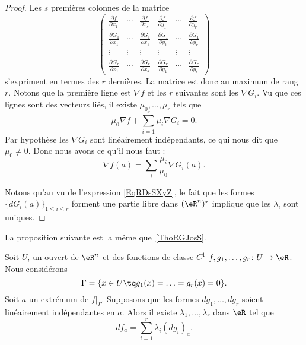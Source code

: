 \begin{proof}
	Les \( s\) premières colonnes de la matrice
	\begin{equation}
		\begin{pmatrix}
			\frac{ \partial f }{ \partial x_1 }   & \cdots & \frac{ \partial f }{ \partial x_s }   & \frac{ \partial f }{ \partial y_1 }   & \cdots & \frac{ \partial f }{ \partial y_r }   \\
			\frac{ \partial G_1 }{ \partial x_1 } & \cdots & \frac{ \partial G_1 }{ \partial x_s } & \frac{ \partial G_1 }{ \partial y_1 } & \cdots & \frac{ \partial G_1 }{ \partial y_r } \\
			\vdots                                & \vdots & \vdots                                & \vdots                                & \vdots & \vdots                                \\
			\frac{ \partial G_r }{ \partial x_1 } & \cdots & \frac{ \partial G_r }{ \partial x_s } & \frac{ \partial G_r }{ \partial y_1 } & \cdots & \frac{ \partial G_r }{ \partial y_r }
		\end{pmatrix}
	\end{equation}
	s'expriment en termes des \( r\) dernières. La matrice est donc au maximum de rang \( r\). Notons que la première ligne est \( \nabla f\) et les \( r\) suivantes sont les \( \nabla G_i\). Vu que ces lignes sont des vecteurs liés, il existe \( \mu_0,\ldots, \mu_r\) tels que
	\begin{equation}
		\mu_0\nabla f+\sum_{i=1}^r\mu_i\nabla G_i=0.
	\end{equation}
	Par hypothèse les \( \nabla G_i\) sont linéairement indépendants, ce qui nous dit que \( \mu_0\neq 0\). Donc nous avons ce qu'il nous faut :
	\begin{equation}
		\nabla f(a)=\sum_i\frac{ \mu_i }{ \mu_0 } \nabla G_i(a).
	\end{equation}

	Notons qu'au vu de l'expression \eqref{EqRDsSXyZ}, le fait que les formes \( \{ dG_i(a) \}_{1\leq i\leq r}\) forment une partie libre dans \( (\eR^n)^*\) implique que les \( \lambda_i\) sont uniques.
\end{proof}

La proposition suivante est la même que~\ref{ThoRGJosS}.
\begin{proposition} \label{PropfPPUxh}
	Soit \( U\), un ouvert de \( \eR^n\) et des fonctions de classe \( C^1\) \( f,g_1,\ldots, g_r\colon U\to \eR\). Nous considérons
	\begin{equation}
		\Gamma=\{ x\in U\tq g_1(x)=\ldots=g_r(x)=0 \}.
	\end{equation}
	Soit \( a\) un extrémum de \( f|_{\Gamma}\). Supposons que les formes \( dg_1,\ldots, dg_r\) soient linéairement indépendantes en \( a\). Alors il existe \( \lambda_1,\ldots, \lambda_r\) dans \( \eR\) tel que
	\begin{equation}
		df_a=\sum_{i=1}^r\lambda_i(dg_i)_a.
	\end{equation}
\end{proposition}


